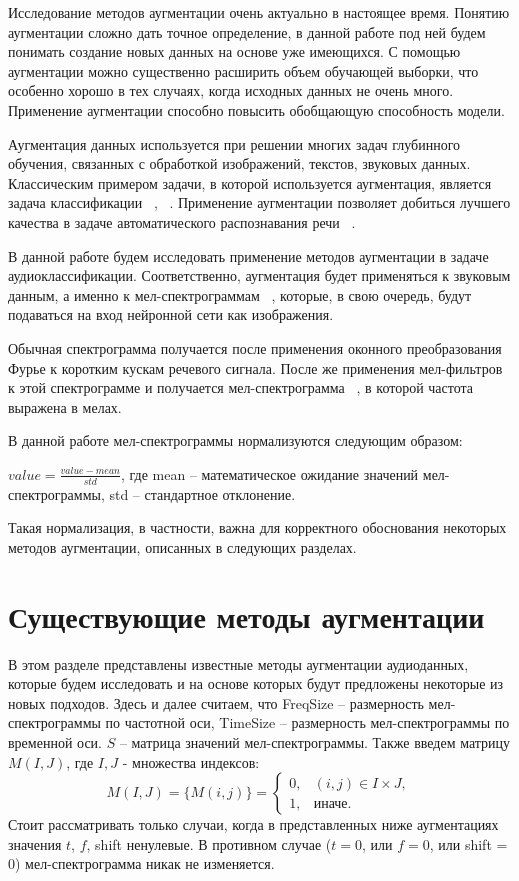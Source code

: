 \documentclass[12pt, fleqn]{article}
\begin{document}
	Исследование методов аугментации очень актуально в настоящее время. Понятию аугментации сложно дать точное определение, в данной работе под ней будем понимать создание новых данных на основе уже имеющихся. С помощью аугментации можно существенно расширить объем обучающей выборки, что особенно хорошо в тех случаях, когда исходных данных не очень много. Применение аугментации способно повысить обобщающую способность модели. 
	
	Аугментация данных используется при решении многих задач глубинного обучения, связанных с обработкой изображений, текстов, звуковых данных. Классическим примером задачи, в которой используется аугментация, является задача классификации ~\cite{b2}, ~\cite{b3}. Применение аугментации позволяет добиться лучшего качества в задаче автоматического распознавания речи ~\cite{b1}. 
		
	В данной работе будем исследовать применение методов аугментации в задаче аудиоклассификации. Соответственно, аугментация будет применяться к звуковым данным, а именно к мел-спектрограммам ~\cite{b1}, которые, в свою очередь, будут подаваться на вход нейронной сети как изображения. 
	
	Обычная спектрограмма получается после применения оконного преобразования Фурье к коротким кускам речевого сигнала. После же применения мел-фильтров к этой спектрограмме и получается мел-спектрограмма ~\cite{b8}, в которой частота выражена в мелах.
	
	В данной работе мел-спектрограммы нормализуются следующим образом: 
	
	$ value = \frac{value - mean}{std}$, где mean -- математическое ожидание значений мел-спектрограммы, std -- стандартное отклонение. 
	
	Такая нормализация, в частности, важна для корректного обоснования некоторых методов аугментации, описанных в следующих разделах.
	\section{Существующие методы аугментации}
	В этом разделе представлены известные методы аугментации аудиоданных, которые будем исследовать и на основе которых будут предложены некоторые из новых подходов. 	
	\newline Здесь и далее считаем, что FreqSize -- размерность мел-спектрограммы по частотной оси, TimeSize -- размерность мел-спектрограммы по временной оси.
	$S$ -- матрица значений мел-спектрограммы. \newline
	Также введем матрицу $M(I, J)$, где $I, J$ - множества индексов: \newline 
	\begin{equation*}
	M(I, J) = \{M(i, j)\} = 
	\begin{cases}
	0, & (i,j) \in I \times J,\\
	1, &\text{иначе}.
	\end{cases}
	\end{equation*}
	Стоит рассматривать только случаи, когда в представленных ниже аугментациях значения $t$, $f$, shift ненулевые. В противном случае ($t = 0$, или $f = 0$, или shift = 0) мел-спектрограмма никак не изменяется.
	
\end{document}
